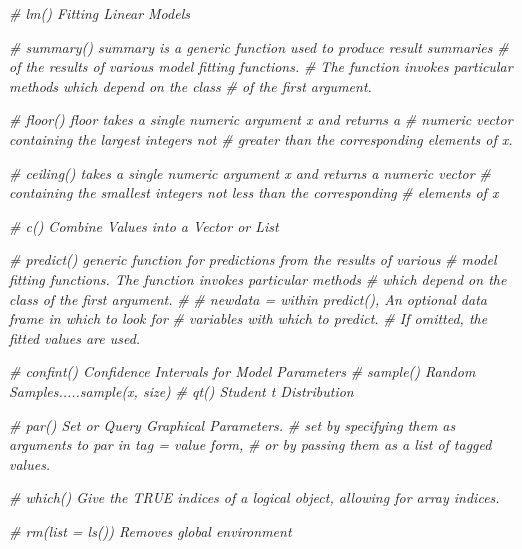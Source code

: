 \documentclass[
]{article}
\newenvironment{Shaded}{\begin{snugshade}}{\end{snugshade}}
\newcommand{\CommentTok}[1]{\textcolor[rgb]{0.56,0.35,0.01}{\textit{#1}}}
\begin{document}
\begin{Shaded}
\begin{Highlighting}[]
\CommentTok{\# lm()          Fitting Linear Models}

\CommentTok{\# summary()     summary is a generic function used to produce result summaries }
\CommentTok{\#               of the results of various model fitting functions. }
\CommentTok{\#               The function invokes particular methods which depend on the class }
\CommentTok{\#               of the first argument.}

\CommentTok{\# floor()      floor takes a single numeric argument x and returns a }
\CommentTok{\#              numeric vector containing the largest integers not }
\CommentTok{\#              greater than the corresponding elements of x.  }

\CommentTok{\# ceiling()    takes a single numeric argument x and returns a numeric vector }
\CommentTok{\#              containing the smallest integers not less than the corresponding }
\CommentTok{\#              elements of x}

\CommentTok{\# c()          Combine Values into a Vector or List}

\CommentTok{\# predict()    generic function for predictions from the results of various }
\CommentTok{\#              model fitting functions. The function invokes particular methods }
\CommentTok{\#              which depend on the class of the first argument.}
\CommentTok{\#}
\CommentTok{\# newdata =   within predict(), An optional data frame in which to look for }
\CommentTok{\#             variables with which to predict. }
\CommentTok{\#             If omitted, the fitted values are used.}

\CommentTok{\# confint()   Confidence Intervals for Model Parameters}
\CommentTok{\# sample()    Random Samples.....sample(x, size)}
\CommentTok{\# qt()        Student t Distribution}

\CommentTok{\# par()       Set or Query Graphical Parameters.}
\CommentTok{\#             set by specifying them as arguments to par in tag = value form, }
\CommentTok{\#             or by passing them as a list of tagged values.}

\CommentTok{\# which()     Give the TRUE indices of a logical object, allowing for array indices.}




\CommentTok{\# rm(list = ls())      Removes global environment}
\end{Highlighting}
\end{Shaded}
\end{document}
